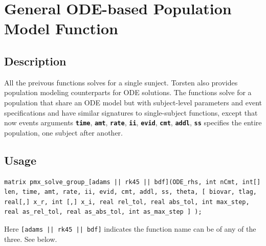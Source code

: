 \documentclass[10pt, reqno, oneside]{amsbook}
\numberwithin{equation}{chapter}
\numberwithin{figure}{chapter}
\numberwithin{table}{chapter}
\theoremstyle{remark}
\begin{document}
\section{General ODE-based Population Model Function}
\label{sec:org14f20f4}
\subsection{Description}
\label{sec:orge015938}
All the preivous functions solves for a single sunject. Torsten also
provides population modeling counterparts for ODE solutions. The
functions solve for a population that share an ODE model but with
subject-level parameters and event specifications and have similar
signatures to single-subject functions, except that now events
arguments {\small \color{MRGGreen} \texttt{\textbf{time}}}, {\small \color{MRGGreen} \texttt{\textbf{amt}}}, {\small \color{MRGGreen} \texttt{\textbf{rate}}}, {\small \color{MRGGreen} \texttt{\textbf{ii}}},
{\small \color{MRGGreen} \texttt{\textbf{evid}}}, {\small \color{MRGGreen} \texttt{\textbf{cmt}}},
{\small \color{MRGGreen} \texttt{\textbf{addl}}}, {\small \color{MRGGreen} \texttt{\textbf{ss}}} specifies the entire
population, one subject after another.
\subsection{Usage}
\label{sec:org563ee28}
\begin{verbatim}
matrix pmx_solve_group_[adams || rk45 || bdf](ODE_rhs, int nCmt, int[] len, time, amt, rate, ii, evid, cmt, addl, ss, theta, [ biovar, tlag, real[,] x_r, int [,] x_i, real rel_tol, real abs_tol, int max_step, real as_rel_tol, real as_abs_tol, int as_max_step ] );
\end{verbatim}
Here \texttt{[adams || rk45 || bdf]} indicates the
function name can be of any of the three. See below.
\end{document}
